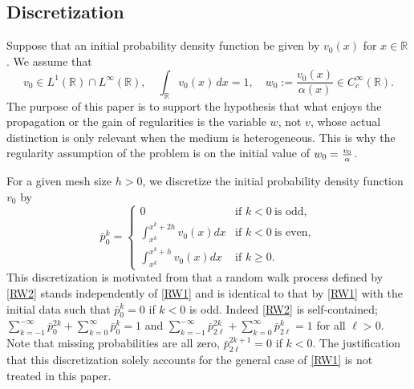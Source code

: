 \documentclass[a4paper,11pt]{article}
\def\R{\mathbb{R}}
\theoremstyle{remark}
\begin{document}
% 


\subsection{Discretization}

Suppose that an initial probability density function be given by $v_0(x)$ for $x\in\R$. We assume that
\begin{equation} \label{initial}
 v_0 \in L^1( \R)\cap L^\infty(\R), \quad \int_ \R v_0(x)\, dx = 1, \quad
 w_0:=\frac{v_0(x)}{\alpha(x)} \in C^\infty_c(\R).
\end{equation}
The purpose of this paper is to support the hypothesis that what enjoys the propagation or the gain of regularities is the variable $w$, not $v$, whose actual distinction is only relevant when the medium is heterogeneous. This is why the regularity assumption of the problem is on the initial value of $w_0={v_0\over\alpha}$.

For a given mesh size $h>0$, we discretize the initial probability density function $v_0$ by
\begin{equation}\label{p0k}
\bar{p}_{0}^{k} = \left\{\begin{array}{ll}
               0 & \text{if } k<0\ \text{is odd},\\
               \int_{x^k}^{x^{k}+2h} v_0(x)dx & \text{if } k<0\ \text{is
               even},\\
                \int_{x^k}^{x^{k}+h} v_0(x)dx  & \text{if } k\ge0.
               \end{array}\right.
\end{equation}
This discretization is motivated from that a random walk process defined by \eqref{RW2} stands independently of \eqref{RW1} and is identical to that by \eqref{RW1} with the initial data such that $\bar{p}^k_0=0$ if $k<0$ is odd. Indeed \eqref{RW2} is self-contained; $\sum_{k=-1}^{-\infty}\bar{p}_{0}^{2k}+\sum_{k=0}^{\infty}\bar{p}_{0}^{k}= 1$ and $\sum_{k=-1}^{-\infty}\bar{p}_{2\ell}^{2k}+\sum_{k=0}^{\infty}\bar{p}_{2\ell}^{k}=1$ for all $\ell>0$. Note that missing probabilities are all zero, $\bar{p}_{2\ell}^{2k+1}=0$ if $k<0$. The justification that this discretization solely  accounts for the general case of \eqref{RW1} is not treated in this paper. 
\end{document}
